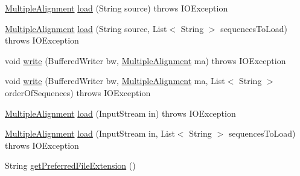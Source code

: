 \begin{DoxyCompactItemize}
\item 
\hyperlink{classbroad_1_1core_1_1multiplealignment_1_1_multiple_alignment}{Multiple\+Alignment} \hyperlink{classbroad_1_1core_1_1multiplealignment_1_1_fasta_multiple_alignment_i_o_a09fc82c9274e7449149f77b74e01508e}{load} (String source)  throws I\+O\+Exception 
\item 
\hyperlink{classbroad_1_1core_1_1multiplealignment_1_1_multiple_alignment}{Multiple\+Alignment} \hyperlink{classbroad_1_1core_1_1multiplealignment_1_1_fasta_multiple_alignment_i_o_a85484122565c839ce063a9232ad15b73}{load} (String source, List$<$ String $>$ sequences\+To\+Load)  throws I\+O\+Exception 
\item 
void \hyperlink{classbroad_1_1core_1_1multiplealignment_1_1_fasta_multiple_alignment_i_o_ac21b9204f76aab283bb22a6d1be46c9a}{write} (Buffered\+Writer bw, \hyperlink{classbroad_1_1core_1_1multiplealignment_1_1_multiple_alignment}{Multiple\+Alignment} ma)  throws I\+O\+Exception 
\item 
void \hyperlink{classbroad_1_1core_1_1multiplealignment_1_1_fasta_multiple_alignment_i_o_ab9c7bc63f40a089c0461ae5bb1536719}{write} (Buffered\+Writer bw, \hyperlink{classbroad_1_1core_1_1multiplealignment_1_1_multiple_alignment}{Multiple\+Alignment} ma, List$<$ String $>$ order\+Of\+Sequences)  throws I\+O\+Exception 
\item 
\hyperlink{classbroad_1_1core_1_1multiplealignment_1_1_multiple_alignment}{Multiple\+Alignment} \hyperlink{classbroad_1_1core_1_1multiplealignment_1_1_fasta_multiple_alignment_i_o_a8bd83d6a6cf05fb06ae522a221dc5613}{load} (Input\+Stream in)  throws I\+O\+Exception 
\item 
\hyperlink{classbroad_1_1core_1_1multiplealignment_1_1_multiple_alignment}{Multiple\+Alignment} \hyperlink{classbroad_1_1core_1_1multiplealignment_1_1_fasta_multiple_alignment_i_o_a5624c6d19afcd2bc27b60e7dde43ed9e}{load} (Input\+Stream in, List$<$ String $>$ sequences\+To\+Load)  throws I\+O\+Exception 
\item 
String \hyperlink{classbroad_1_1core_1_1multiplealignment_1_1_fasta_multiple_alignment_i_o_a7c484cb6c86e23c98dff7add42684dfc}{get\+Preferred\+File\+Extension} ()
\end{DoxyCompactItemize}


